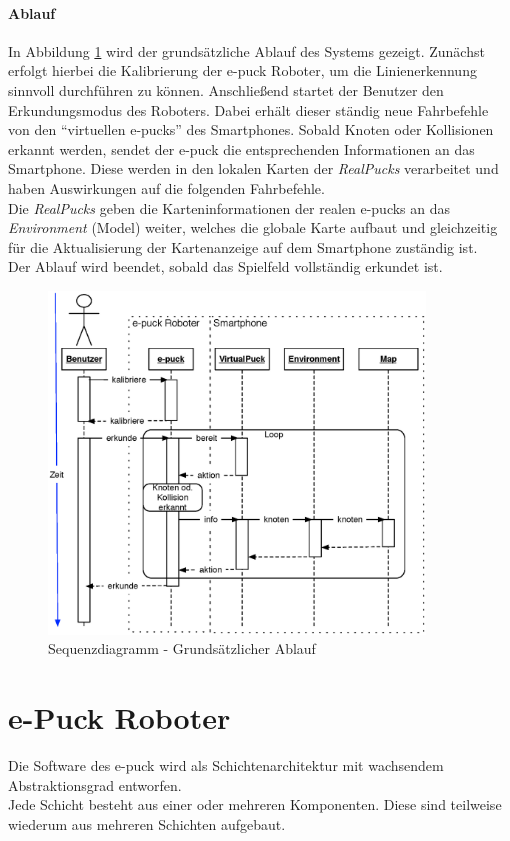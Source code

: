 \documentclass[10pt,a4paper]{article}
\begin{document}
		\paragraph*{Ablauf}		
		In Abbildung \ref{fig:ablauf} wird der grundsätzliche Ablauf des Systems gezeigt. Zunächst erfolgt hierbei die Kalibrierung der e-puck Roboter, um
		die Linienerkennung sinnvoll durchführen zu können. Anschließend startet der Benutzer den Erkundungsmodus des Roboters. Dabei erhält dieser
		ständig neue Fahrbefehle von den ``virtuellen e-pucks'' des Smartphones. Sobald Knoten oder Kollisionen erkannt werden, sendet der e-puck
		die entsprechenden Informationen an das Smartphone. Diese werden in den lokalen Karten der \textit{RealPucks} verarbeitet und haben
		Auswirkungen auf die folgenden Fahrbefehle.\\
		Die \textit{RealPucks} geben die Karteninformationen der realen e-pucks an das \textit{Environment} (Model) weiter, welches die globale Karte
		aufbaut und gleichzeitig für die Aktualisierung der Kartenanzeige auf dem Smartphone zuständig ist.\\
		Der Ablauf wird beendet, sobald das Spielfeld vollständig erkundet ist.		
		\begin{figure}[htbp]
			\centering
			\includegraphics[width=10cm]{images/sequenzdiagramm.eps}
  			\caption{Sequenzdiagramm - Grundsätzlicher Ablauf}
  			\label{fig:ablauf}
  		\end{figure}				
	\section{e-Puck Roboter}
		Die Software des e-puck wird als Schichtenarchitektur mit wachsendem Abstraktionsgrad entworfen. \\
		Jede Schicht besteht aus einer oder mehreren Komponenten. Diese sind teilweise wiederum aus mehreren
		Schichten aufgebaut. \\
		
\end{document}
